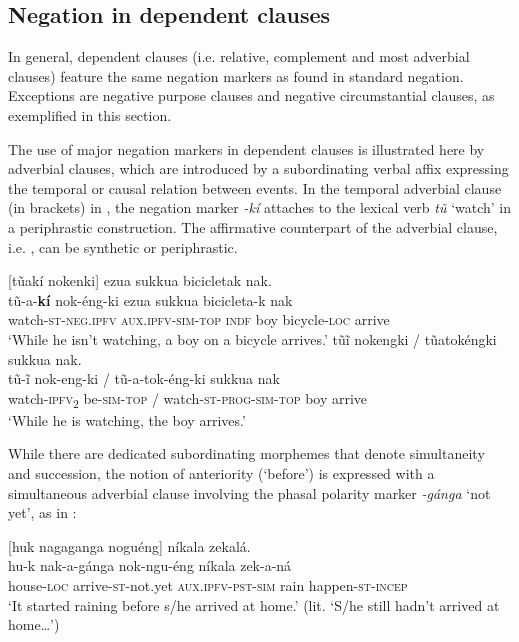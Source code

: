 \documentclass[output=paper,colorlinks,citecolor=brown]{langscibook}
\begin{document}
 
\subsection{Negation in dependent clauses}\label{sec:kog:2.4}

In general, dependent clauses (i.e. relative, complement and most adverbial clauses) feature the same negation markers as found in standard negation. Exceptions are negative purpose clauses and negative circumstantial clauses, as exemplified in this section.

The use of major negation markers in dependent clauses is illustrated here by adverbial clauses, which are introduced by a subordinating verbal affix expressing the temporal or causal relation between events. In the temporal adverbial clause (in brackets) in , the negation marker \textit{{}-kí} attaches to the lexical verb \textit{tũ} ‘watch’ in a periphrastic construction. The affirmative counterpart of the adverbial clause, i.e. , can be synthetic or periphrastic.

\ea\label{ex:kog:52}
    \ea\label{ex:kog:52a}[tũakí nokenki] ezua sukkua bicicletak nak.\\
        \gll  tũ{}-a-\textbf{kí} nok-éng-ki ezua sukkua bicicleta-k nak\\ 
              watch\textsc{{}-st-neg.ipfv} \textsc{aux.ipfv}{}-\textsc{sim{}-top} \textsc{indf} boy bicycle-\textsc{loc} arrive\\
        \glt  ‘While he isn't watching, a boy on a bicycle arrives.’
    \ex\label{ex:kog:52b}tũĩ  nokengki / tũatokéngki sukkua nak.\\
        \gll   tũ{}-ĩ  nok{}-eng-ki / tũ{}-a{}-tok{}-éng-ki sukkua nak\\
              watch{}-\textsc{ipfv}\textsc{\textsubscript{2}} be-\textsc{sim-top} / watch\textsc{{}-st-prog{}-sim{}-top} boy arrive\\
        \glt ‘While he is watching, the boy arrives.’ 
    \z
\z 

While there are dedicated subordinating morphemes that denote simultaneity and succession, the notion of anteriority (‘before’) is expressed with a simultaneous adverbial clause involving the phasal polarity marker \textit{{}-g\'{a}nga} ‘not yet’, as in :
 
 \newpage
\ea\label{ex:kog:53} [huk nagaganga noguéng] níkala zekalá.\\
    \gll   hu-k nak-a-gánga nok-ngu-éng níkala zek-a-ná\\ 
          house-\textsc{loc} arrive\textsc{{}-st-}not.yet \textsc{aux.ipfv}{}-\textsc{pst{}-sim} rain happen-\textsc{st-incep}\\
    \glt  ‘It started raining before s/he arrived at home.’ (lit. ‘S/he still hadn't arrived at home…')
\z 
\end{document}

